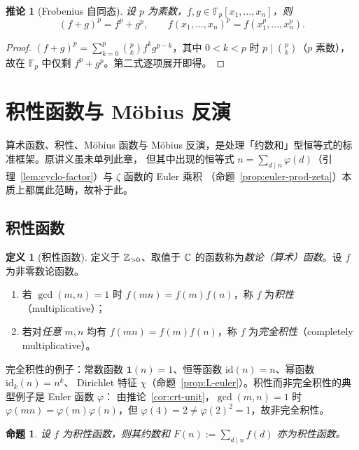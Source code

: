 \documentclass{article}
\theoremstyle{plain}
\newtheorem{cor}[thm]{推论}
\newtheorem{prop}[thm]{命题}
\theoremstyle{definition}
\newtheorem{defn}[thm]{定义}
\theoremstyle{remark}
\begin{document}
\begin{cor}[Frobenius 自同态]\label{cor:frobenius}
  设 $p$ 为素数，$f,g\in\mathbb{F}_p[x_1,\dots,x_n]$，则
  \[
    (f+g)^p=f^p+g^p,\qquad f(x_1,\dots,x_n)^p=f(x_1^p,\dots,x_n^p).
  \]
\end{cor}

\begin{proof}
  $(f+g)^p=\sum_{k=0}^p\binom pk f^k g^{p-k}$，其中 $0<k<p$ 时 $p\mid\binom pk$（$p$ 素数），故在 $\mathbb{F}_p$ 中仅剩 $f^p+g^p$。第二式逐项展开即得。
\end{proof}

\section{积性函数与 Möbius 反演}\label{sec:mobius}

算术函数、积性、Möbius 函数与 Möbius 反演，是处理「约数和」型恒等式的标准框架。原讲义虽未单列此章，
但其中出现的恒等式 $n=\sum_{d\mid n}\varphi(d)$（引理~\ref{lem:cyclo-factor}）与 $\zeta$ 函数的 Euler 乘积
（命题~\ref{prop:euler-prod-zeta}）本质上都属此范畴，故补于此。

\subsection{积性函数}

\begin{defn}[积性函数]
  定义于 $\mathbb{Z}_{>0}$、取值于 $\mathbb{C}$ 的函数称为\emph{数论（算术）函数}。设 $f$ 为非零数论函数。
  \begin{enumerate}[(1)]
    \item 若 $\gcd(m,n)=1$ 时 $f(mn)=f(m)f(n)$，称 $f$ 为\emph{积性}（multiplicative）；
    \item 若对\emph{任意} $m,n$ 均有 $f(mn)=f(m)f(n)$，称 $f$ 为\emph{完全积性}（completely multiplicative）。
  \end{enumerate}
\end{defn}

完全积性的例子：常数函数 $\mathbf 1(n)=1$、恒等函数 $\mathrm{id}(n)=n$、幂函数 $\mathrm{id}_k(n)=n^k$、
Dirichlet 特征 $\chi$（命题~\ref{prop:L-euler}）。积性而非完全积性的典型例子是 Euler 函数 $\varphi$：
由推论~\ref{cor:crt-unit}，$\gcd(m,n)=1$ 时 $\varphi(mn)=\varphi(m)\varphi(n)$，但
$\varphi(4)=2\ne\varphi(2)^2=1$，故非完全积性。

\begin{prop}\label{prop:mult-divsum}
  设 $f$ 为积性函数，则其约数和 $F(n):=\sum_{d\mid n}f(d)$ 亦为积性函数。
\end{prop}
\end{document}
